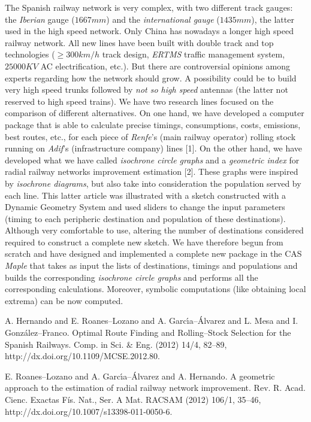 \documentclass[article, A4, 11pt]{llncs}%
\begin{document}
The Spanish railway network is very complex, with two different track gauges: the \textit{Iberian} gauge ($1667 mm$) and the \textit{international gauge} ($1435 mm$), the latter used in the high speed network. Only China has nowadays a longer high speed railway network. All new lines have been built with double track and top technologies ($\geq 300 km/h$ track design, \textit{ERTMS} traffic management system, $25000 KV$ AC electrification, etc.). But there are controversial opinions among experts regarding how the network should grow. A possibility could be to build very high speed trunks followed by \textit{not so high speed} antennas (the latter not reserved to high speed trains). We have two research lines focused on the comparison of different alternatives. On one hand, we have developed a computer package that is able to calculate precise timings, consumptions, costs, emissions, best routes, etc., for each piece of \textit{Renfe}'s (main railway operator) rolling stock running on \textit{Adif}'s (infrastructure company) lines [1]. On the other hand, we have developed what we have called \textit{isochrone circle graphs} and a \textit{geometric index} for radial railway networks improvement estimation [2]. These graphs were inspired by \textit{isochrone diagrams}, but also take into consideration the population served by each line. This latter article was illustrated with a sketch constructed with a Dynamic Geometry System and used sliders to change the input parameters (timing to each peripheric destination and population of these destinations). Although very comfortable to use, altering the number of destinations considered required to construct a complete new sketch. We have therefore begun from scratch and have designed and implemented a complete new package in the CAS \textit{Maple} that takes as input the lists of destinations, timings and populations and builds the corresponding \textit{isochrone circle graphs} and performs all the corresponding calculations. Moreover, symbolic computations (like obtaining local extrema) can be now computed.



\begin{thebibliography}{10}
{\sc A. Hernando and E. Roanes--Lozano and A. Garc\'{\i}a--\'Alvarez and L. Mesa and I. Gonz\'alez--Franco}. {Optimal Route Finding and Rolling--Stock Selection for the Spanish Railways}. Comp. in Sci. \& Eng. (2012) 14/4, 82--89,  http://dx.doi.org/10.1109/MCSE.2012.80.

{\sc E. Roanes--Lozano and A. Garc\'{\i}a--\'Alvarez and A. Hernando}. {A geometric approach to the estimation of radial railway network improvement}. Rev. R. Acad. Cienc. Exactas F\'is. Nat., Ser. A Mat. RACSAM (2012) 106/1, 35--46, http://dx.doi.org/10.1007/s13398-011-0050-6.
\end{thebibliography} %
\end{document}
